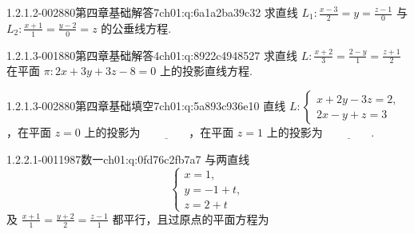 \begin{q}{1.2.1.2-002}{880第四章基础解答7}{ch01:q:6a1a2ba39c32}
求直线 $L_1:\frac{x-3}{2}=y=\frac{z-1}{0}$ 与 $L_2:\frac{x+1}{1}=\frac{y-2}{0}=z$ 的公垂线方程.
\end{q}

\par\addvspace{2.4ex}\noindent
\begin{minipage}{\linewidth}

\begin{q}{1.2.1.3-001}{880第四章基础解答4}{ch01:q:8922c4948527}
求直线 $L:\frac{x+2}{3}=\frac{2-y}{1}=\frac{z+1}{2}$ 在平面 $\pi:2x+3y+3z-8=0$ 上的投影直线方程.
\end{q}
\end{minipage}


\begin{q}{1.2.1.3-002}{880第四章基础填空7}{ch01:q:5a893c936e10}
直线 $L:\begin{cases} x+2y-3z=2,\\ 2x-y+z=3 \end{cases}$，在平面 $z=0$ 上的投影为 $\underline{\hspace{4em}}$，在平面 $z=1$ 上的投影为 $\underline{\hspace{4em}}$.
\end{q}

\par\addvspace{2.4ex}\noindent
\begin{minipage}{\linewidth}


\begin{q}{1.2.2.1-001}{1987数一}{ch01:q:0fd76c2fb7a7}
与两直线 \[\begin{cases} x=1, \\ y=-1+t, \\ z=2+t \end{cases}\] 及 $\displaystyle \frac{x+1}{1}=\frac{y+2}{2}=\frac{z-1}{1}$ 都平行，且过原点的平面方程为 \underline{\hspace{4em}}
\end{q}
\end{minipage}


